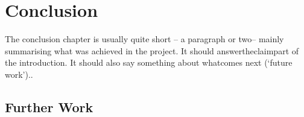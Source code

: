 \chapter{Conclusion}

The conclusion chapter is usually quite short – a paragraph or two– mainly summarising what was achieved in the project. It should answertheclaimpart of the introduction. It should also say something about whatcomes next (‘future work’)..

\section{Further Work}